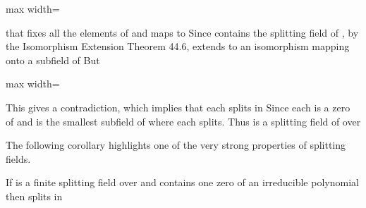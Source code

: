 \documentclass[11pt,oneside]{article}
\begin{document}
\begin{BookBody}
\begin{center}\begin{adjustbox}{max width=\linewidth}\end{adjustbox}\end{center}

\noindent that fixes all the elements of  and maps  to  Since  contains the splitting field of , by the Isomorphism Extension Theorem 44.6,  extends to an isomorphism \BookInline{\sigma } mapping  onto a subfield of  But

\begin{center}\begin{adjustbox}{max width=\linewidth}\end{adjustbox}\end{center}

\noindent This gives a contradiction, which implies that each  splits in  Since each  is a zero of  and  is the smallest subfield of  where each  splits. Thus  is a splitting field of  over \BookEnd{\blacklozenge}

The following corollary highlights one of the very strong properties of splitting fields.

 If  is a finite splitting field over  and  contains one zero of an irreducible polynomial  then  splits in 

\end{BookBody}

\BookNarrativetrue
\end{document}
